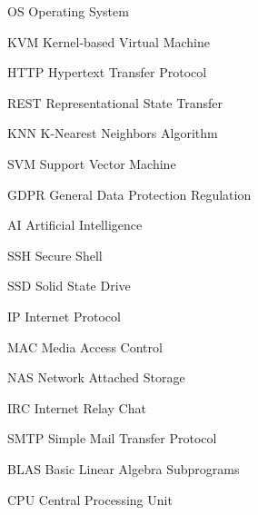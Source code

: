 \begin{abbrv}
    \item[OS]           Operating System
    \item[KVM]          Kernel-based Virtual Machine
    \item[HTTP]         Hypertext Transfer Protocol
    \item[REST]         Representational State Transfer
    \item[KNN]          K-Nearest Neighbors Algorithm
    \item[SVM]          Support Vector Machine
    \item[GDPR]         General Data Protection Regulation
    \item[AI]           Artificial Intelligence
    \item[SSH]          Secure Shell
    \item[SSD]          Solid State Drive
    \item[IP]           Internet Protocol
    \item[MAC]          Media Access Control
    \item[NAS]          Network Attached Storage
    \item[IRC]          Internet Relay Chat
    \item[SMTP]         Simple Mail Transfer Protocol
    \item[BLAS]         Basic Linear Algebra Subprograms
    \item[CPU]          Central Processing Unit
\end{abbrv}
